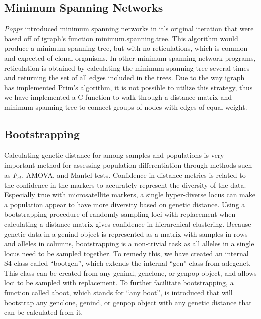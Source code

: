 \documentclass{frontiersSCNS} %
\begin{document}
\subsection*{Minimum Spanning Networks}\label{minimum-spanning-networks}

\emph{Poppr} introduced minimum spanning networks in it's original
iteration that were based off of igraph's function
minimum.spanning.tree. This algorithm would produce a minimum spanning
tree, but with no reticulations, which is common and expected of clonal
organisms. In other minimum spanning network programs, reticulation is
obtained by calculating the minimum spanning tree several times and
returning the set of all edges included in the trees. Due to the way
igraph has implemented Prim's algorithm, it is not possible to utilize
this strategy, thus we have implemented a C function to walk through a
distance matrix and minimum spanning tree to connect groups of nodes
with edges of equal weight.

\subsection*{Bootstrapping}\label{bootstrapping}

Calculating genetic distance for among samples and populations is very
important method for assessing population differentiation through
methods such as \(F_{st}\), AMOVA, and Mantel tests. Confidence in
distance metrics is related to the confidence in the markers to
accurately represent the diversity of the data. Especially true with
microsatellite markers, a single hyper-diverse locus can make a
population appear to have more diversity based on genetic distance.
Using a bootstrapping procedure of randomly sampling loci with
replacement when calculating a distance matrix gives confidence in
hierarchical clustering. Because genetic data in a genind object is
represented as a matrix with samples in rows and alleles in columns,
bootstrapping is a non-trivial task as all alleles in a single locus
need to be sampled together. To remedy this, we have created an internal
S4 class called ``bootgen'', which extends the internal ``gen'' class
from adegenet. This class can be created from any genind, genclone, or
genpop object, and allows loci to be sampled with replacement. To
further facilitate bootstrapping, a function called aboot, which stands
for ``any boot'', is introduced that will bootstrap any genclone,
genind, or genpop object with any genetic distance that can be
calculated from it.
\end{document}
